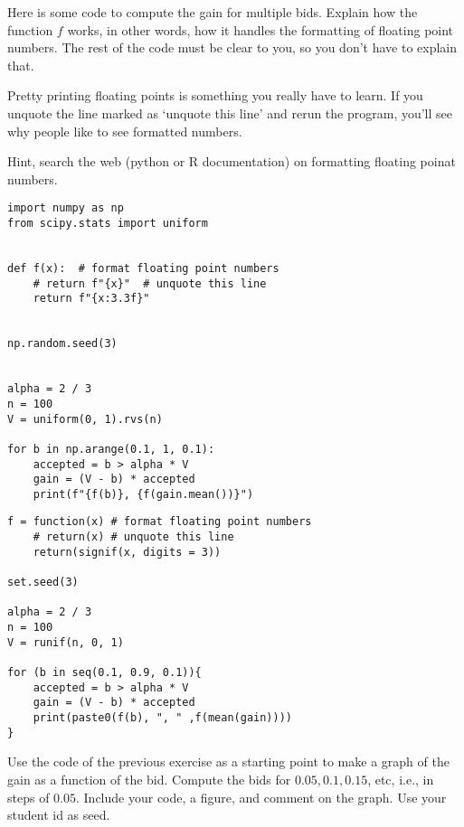 \begin{exercise}
Here is some code to compute the gain for multiple bids. Explain how the function $f$ works, in other words, how it handles the  formatting of floating point numbers.
The rest of the code must be clear to you, so you don't have to explain that.

Pretty printing floating points is something you really have to learn. If you unquote the line marked as `unquote this line' and rerun the program, you'll see why people like to see formatted numbers.

Hint, search the web (python or R documentation) on formatting floating poinat numbers.
\begin{verbatim}
import numpy as np
from scipy.stats import uniform


def f(x):  # format floating point numbers
    # return f"{x}"  # unquote this line
    return f"{x:3.3f}"


np.random.seed(3)


alpha = 2 / 3
n = 100
V = uniform(0, 1).rvs(n)

for b in np.arange(0.1, 1, 0.1):
    accepted = b > alpha * V
    gain = (V - b) * accepted
    print(f"{f(b)}, {f(gain.mean())}")
\end{verbatim}

\begin{verbatim}
f = function(x) # format floating point numbers
    # return(x) # unquote this line
    return(signif(x, digits = 3))

set.seed(3)

alpha = 2 / 3
n = 100
V = runif(n, 0, 1)

for (b in seq(0.1, 0.9, 0.1)){
    accepted = b > alpha * V
    gain = (V - b) * accepted
    print(paste0(f(b), ", " ,f(mean(gain))))
}
\end{verbatim}
\end{exercise}


\begin{exercise}
Use the  code of the previous exercise as a starting point to make a graph of the gain as a function of the bid. Compute the bids for $0.05, 0.1, 0.15$, etc, i.e., in steps of $0.05$. Include your code,  a figure, and comment on the graph.  Use your student id as seed.
\end{exercise}



